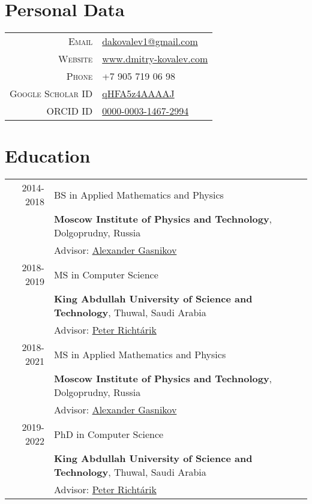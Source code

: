 \section{Personal Data}

\begin{tabular}{rl}
	\textsc{Email} & \href{mailto:dakovalev1@gmail.com}{dakovalev1@gmail.com}\\
	\textsc{Website} & \href{https://www.dmitry-kovalev.com}{www.dmitry-kovalev.com}\\
	\textsc{Phone} & +7 905 719 06 98\\
	\textsc{Google Scholar ID} &\href{https://scholar.google.com/citations?user=qHFA5z4AAAAJ}{qHFA5z4AAAAJ}\\
	\textsc{ORCID ID} & \href{https://orcid.org/0000-0003-1467-2994}{0000-0003-1467-2994}
\end{tabular}



\section{Education}
\begin{tabular}{rl}	
	\textsc{2014-2018}& BS in Applied Mathematics and Physics\\
	& \textbf{Moscow Institute of Physics and Technology}, Dolgoprudny, Russia\\
	& Advisor: \href{https://scholar.google.com/citations?user=AmeE8qkAAAAJ}{Alexander Gasnikov}\\
	\textsc{2018-2019}& MS in Computer Science\\
	& \textbf{King Abdullah University of Science and Technology}, Thuwal, Saudi Arabia\\
	& Advisor: \href{https://richtarik.org}{Peter Richt\'{a}rik}\\
	\textsc{2018-2021}& MS in Applied Mathematics and Physics\\
	& \textbf{Moscow Institute of Physics and Technology}, Dolgoprudny, Russia\\
	& Advisor: \href{https://scholar.google.com/citations?user=AmeE8qkAAAAJ}{Alexander Gasnikov}\\
	\textsc{2019-2022}& PhD in Computer Science\\
	& \textbf{King Abdullah University of Science and Technology}, Thuwal, Saudi Arabia\\
	& Advisor: \href{https://richtarik.org}{Peter Richt\'{a}rik}\\
\end{tabular}

